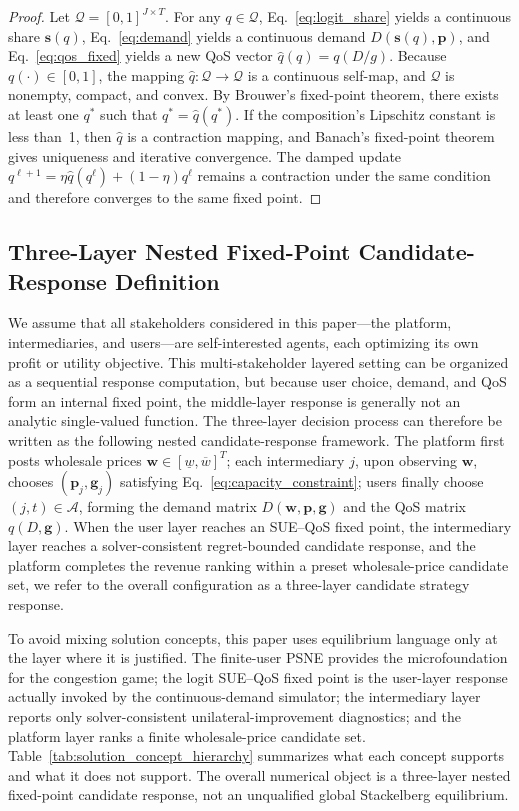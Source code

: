 \documentclass[11pt,a4paper]{article}
\newcommand{\qos}{q}
\newcommand{\A}{\mathcal{A}}
\newcommand{\D}{D}
\newcommand{\w}{\boldsymbol{w}}
\newcommand{\p}{\boldsymbol{p}}
\newcommand{\g}{\boldsymbol{g}}
\begin{document}
\begin{proof}
Let $\mathcal{Q}=[0,1]^{J\times T}$. For any $q\in\mathcal{Q}$, Eq.~\eqref{eq:logit_share} yields a continuous share $\boldsymbol{s}(q)$, Eq.~\eqref{eq:demand} yields a continuous demand $\D(\boldsymbol{s}(q),\p)$, and Eq.~\eqref{eq:qos_fixed} yields a new QoS vector $\widehat q(q)=\qos(\D/g)$. Because $\qos(\cdot)\in[0,1]$, the mapping $\widehat q:\mathcal{Q}\to\mathcal{Q}$ is a continuous self-map, and $\mathcal{Q}$ is nonempty, compact, and convex. By Brouwer's fixed-point theorem, there exists at least one $q^*$ such that $q^*=\widehat q(q^*)$. If the composition's Lipschitz constant is less than~1, then $\widehat q$ is a contraction mapping, and Banach's fixed-point theorem gives uniqueness and iterative convergence. The damped update $q^{\ell+1}=\eta\widehat q(q^\ell)+(1-\eta)q^\ell$ remains a contraction under the same condition and therefore converges to the same fixed point.
\end{proof}

\subsection{Three-Layer Nested Fixed-Point Candidate-Response Definition}
\label{sec:three_level_game}

We assume that all stakeholders considered in this paper---the platform, intermediaries, and users---are self-interested agents, each optimizing its own profit or utility objective. This multi-stakeholder layered setting can be organized as a sequential response computation, but because user choice, demand, and QoS form an internal fixed point, the middle-layer response is generally not an analytic single-valued function. The three-layer decision process can therefore be written as the following nested candidate-response framework. The platform first posts wholesale prices $\w\in[\underline w,\overline w]^T$; each intermediary $j$, upon observing $\w$, chooses $(\p_j,\g_j)$ satisfying Eq.~\eqref{eq:capacity_constraint}; users finally choose $(j,t)\in\A$, forming the demand matrix $\D(\w,\p,\g)$ and the QoS matrix $q(\D,\g)$. When the user layer reaches an SUE--QoS fixed point, the intermediary layer reaches a solver-consistent regret-bounded candidate response, and the platform completes the revenue ranking within a preset wholesale-price candidate set, we refer to the overall configuration as a three-layer candidate strategy response.

To avoid mixing solution concepts, this paper uses equilibrium language only at the layer where it is justified. The finite-user PSNE provides the microfoundation for the congestion game; the logit SUE--QoS fixed point is the user-layer response actually invoked by the continuous-demand simulator; the intermediary layer reports only solver-consistent unilateral-improvement diagnostics; and the platform layer ranks a finite wholesale-price candidate set. Table~\ref{tab:solution_concept_hierarchy} summarizes what each concept supports and what it does not support. The overall numerical object is a three-layer nested fixed-point candidate response, not an unqualified global Stackelberg equilibrium.
\end{document}
